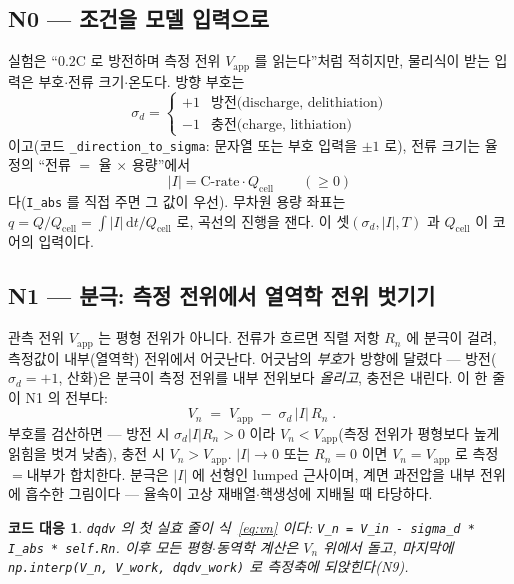 \documentclass[11pt,a4paper]{article}
\newtheorem*{codebox}{코드 대응}
\newcommand{\dd}{\mathrm{d}}
\newcommand{\app}{\mathrm{app}}
\newcommand{\cell}{\mathrm{cell}}
\newcommand{\code}[1]{\texttt{#1}}
\begin{document}
\subsection{N0 — 조건을 모델 입력으로}
실험은 ``$0.2$C 로 방전하며 측정 전위 $V_\app$ 를 읽는다''처럼 적히지만, 물리식이 받는 입력은 부호$\cdot$전류 크기$\cdot$온도다. 방향 부호는
\begin{equation}
\sigma_d=\begin{cases}+1 & \text{방전(discharge, delithiation)}\\ -1 & \text{충전(charge, lithiation)}\end{cases}
\label{eq:sigma}
\end{equation}
이고(코드 \code{\_direction\_to\_sigma}: 문자열 또는 부호 입력을 $\pm1$ 로), 전류 크기는 율 정의 ``전류 $=$ 율 $\times$ 용량''에서
\begin{equation}
|I|=\text{C-rate}\cdot Q_\cell\qquad(\ge0)
\label{eq:Iabs}
\end{equation}
다(\code{I\_abs} 를 직접 주면 그 값이 우선). 무차원 용량 좌표는 $q=Q/Q_\cell=\int|I|\,\dd t/Q_\cell$ 로, 곡선의 진행을 잰다. 이 셋$(\sigma_d,|I|,T)$ 과 $Q_\cell$ 이 코어의 입력이다.

\subsection{N1 — 분극: 측정 전위에서 열역학 전위 벗기기}
관측 전위 $V_\app$ 는 평형 전위가 아니다. 전류가 흐르면 직렬 저항 $R_n$ 에 분극이 걸려, 측정값이 내부(열역학) 전위에서 어긋난다. 어긋남의 \emph{부호}가 방향에 달렸다 — 방전($\sigma_d=+1$, 산화)은 분극이 측정 전위를 내부 전위보다 \emph{올리고}, 충전은 내린다. 이 한 줄이 N1 의 전부다:
\begin{equation}
\boxed{\;V_n\;=\;V_\app\;-\;\sigma_d\,|I|\,R_n\;.}
\label{eq:vn}
\end{equation}
부호를 검산하면 — 방전 시 $\sigma_d|I|R_n>0$ 이라 $V_n<V_\app$(측정 전위가 평형보다 높게 읽힘을 벗겨 낮춤), 충전 시 $V_n>V_\app$. $|I|\to0$ 또는 $R_n=0$ 이면 $V_n=V_\app$ 로 측정$=$내부가 합치한다. 분극은 $|I|$ 에 선형인 lumped 근사이며, 계면 과전압을 내부 전위에 흡수한 그림이다 — 율속이 고상 재배열$\cdot$핵생성에 지배될 때 타당하다.

\begin{codebox}
\code{dqdv} 의 첫 실효 줄이 식~\eqref{eq:vn} 이다: \code{V\_n = V\_in - sigma\_d * I\_abs * self.Rn}. 이후 모든 평형$\cdot$동역학 계산은 $V_n$ 위에서 돌고, 마지막에 \code{np.interp(V\_n, V\_work, dqdv\_work)} 로 측정축에 되앉힌다(N9).
\end{codebox}
\end{document}
